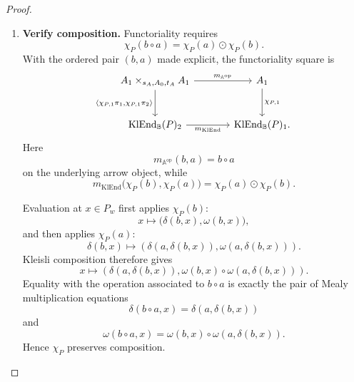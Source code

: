 \begin{proof}
\begin{enumerate}
        \item \textbf{Verify composition.}
        Functoriality requires
        \[
            \chi_P(b\circ a)
            =
            \chi_P(a)\odot\chi_P(b).
        \]
        With the ordered pair \((b,a)\) made explicit, the functoriality
        square is
        \[
        \begin{tikzcd}[column sep=large, row sep=large]
            A_1\times_{s_A,A_0,t_A}A_1
                \arrow[r, "m_{\mathbb A^{\mathrm{op}}}"]
                \arrow[d,
                "{\langle
                    \chi_{P,1}\pi_1,
                    \chi_{P,1}\pi_2
                  \rangle}"']
            &
            A_1
                \arrow[d, "\chi_{P,1}"]
            \\
            \operatorname{KlEnd}_{\mathbb B}(P)_2
                \arrow[r, "m_{\operatorname{KlEnd}}"']
            &
            \operatorname{KlEnd}_{\mathbb B}(P)_1.
        \end{tikzcd}
        \]
        Here
        \[
            m_{\mathbb A^{\mathrm{op}}}(b,a)
            =
            b\circ a
        \]
        on the underlying arrow object, while
        \[
            m_{\operatorname{KlEnd}}
            \bigl(
                \chi_P(b),
                \chi_P(a)
            \bigr)
            =
            \chi_P(a)\odot\chi_P(b).
        \]

        Evaluation at \(x\in P_w\) first applies \(\chi_P(b)\):
        \[
            x
            \longmapsto
            \bigl(
                \delta(b,x),
                \omega(b,x)
            \bigr),
        \]
        and then applies \(\chi_P(a)\):
        \[
            \delta(b,x)
            \longmapsto
            \left(
                \delta(a,\delta(b,x)),
                \omega(a,\delta(b,x))
            \right).
        \]
        Kleisli composition therefore gives
        \[
            x
            \longmapsto
            \left(
                \delta(a,\delta(b,x)),
                \omega(b,x)\circ
                \omega(a,\delta(b,x))
            \right).
        \]
        Equality with the operation associated to \(b\circ a\) is exactly
        the pair of Mealy multiplication equations
        \[
            \delta(b\circ a,x)
            =
            \delta(a,\delta(b,x))
        \]
        and
        \[
            \omega(b\circ a,x)
            =
            \omega(b,x)\circ
            \omega(a,\delta(b,x)).
        \]
        Hence \(\chi_P\) preserves composition.


\end{enumerate}
\end{proof}
